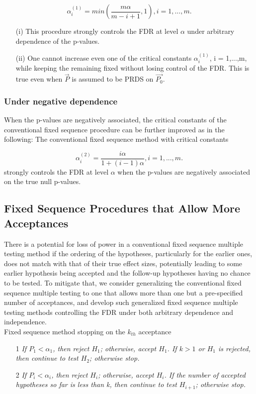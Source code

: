 \documentclass{article}
\begin{document}
$$ \alpha_i^{(1)} = min \left(\frac{m\alpha}{m-i+1} ,1\right), i =1,...,m. $$
\begin{itemize}
	\item[(i)] This procedure strongly controls the FDR at level $\alpha$ under arbitrary dependence of the p-values.
	\item[(ii)] One cannot increase even one of the critical constants $\alpha_i^{(1)}$, i = 1,...,m, while keeping the remaining fixed without losing control of the FDR. This is true even when $\overrightarrow{P}$ is assumed to be PRDS on $\overrightarrow{P_0}$.
\end{itemize}

\subsubsection{Under negative dependence}
When the p-values are negatively associated, the critical constants
of the conventional fixed sequence procedure can be further improved as in the following:
The conventional fixed sequence method with critical constants

$$ \alpha_i^{(2)} = \frac{i\alpha}{1+(i-1)\alpha}, i =1,...,m. $$strongly controls the FDR at level $\alpha$ when the p-values are negatively associated on the true null p-values.

\subsection{Fixed Sequence Procedures that Allow More Acceptances}
There is a potential for loss of power in a conventional fixed sequence multiple testing method if the ordering of the hypotheses, particularly for the earlier ones, does not match with that of their true effect sizes, potentially leading to some earlier hypothesis being accepted and the follow-up hypotheses having no chance to be tested. To mitigate that, we consider generalizing the conventional fixed sequence multiple testing to one that allows more than one but a pre-specified number of acceptances, and develop such generalized
fixed sequence multiple testing methods controlling the FDR under both arbitrary dependence and independence.\\

Fixed sequence method stopping on the $k_{th}$ acceptance
\begin{itemize}
    \item[1] \textit{If $P_1 < \alpha_1$, then reject $H_1$; otherwise, accept $H_1$. If $k > 1$ or $H_1$ is rejected, then continue to test $H_2$; otherwise stop.}
    \item[2] \textit{If  $P_i < \alpha_i$, then reject $H_i$; otherwise, accept $H_i$. If the number of accepted hypotheses
    so far is less than k, then continue to test $H_{i+1}$; otherwise stop.}
\end{itemize}
\end{document}
